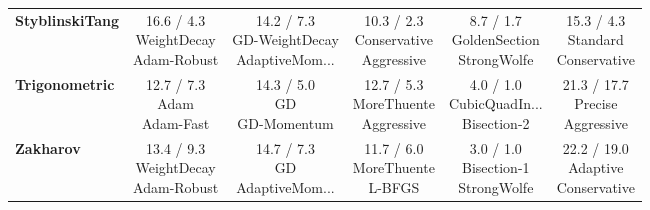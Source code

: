 \documentclass{article}
\begin{document}
\begin{longtable}{lccccc}
\textbf{StyblinskiTang} & \cellcolor{worstred!20} \makecell{16.6 / 4.3 \\ \scriptsize{WeightDecay} \\ \scriptsize{Adam-Robust}}&  \makecell{14.2 / 7.3 \\ \scriptsize{GD-WeightDecay} \\ \scriptsize{AdaptiveMom...}}&  \makecell{10.3 / 2.3 \\ \scriptsize{Conservative} \\ \scriptsize{Aggressive}}& \cellcolor{bestgreen!30} \makecell{8.7 / 1.7 \\ \scriptsize{GoldenSection} \\ \scriptsize{StrongWolfe}}&  \makecell{15.3 / 4.3 \\ \scriptsize{Standard} \\ \scriptsize{Conservative}} \\
\textbf{Trigonometric} &  \makecell{12.7 / 7.3 \\ \scriptsize{Adam} \\ \scriptsize{Adam-Fast}}&  \makecell{14.3 / 5.0 \\ \scriptsize{GD} \\ \scriptsize{GD-Momentum}}&  \makecell{12.7 / 5.3 \\ \scriptsize{MoreThuente} \\ \scriptsize{Aggressive}}& \cellcolor{bestgreen!30} \makecell{4.0 / 1.0 \\ \scriptsize{CubicQuadIn...} \\ \scriptsize{Bisection-2}}& \cellcolor{worstred!20} \makecell{21.3 / 17.7 \\ \scriptsize{Precise} \\ \scriptsize{Aggressive}} \\
\textbf{Zakharov} &  \makecell{13.4 / 9.3 \\ \scriptsize{WeightDecay} \\ \scriptsize{Adam-Robust}}&  \makecell{14.7 / 7.3 \\ \scriptsize{GD} \\ \scriptsize{AdaptiveMom...}}&  \makecell{11.7 / 6.0 \\ \scriptsize{MoreThuente} \\ \scriptsize{L-BFGS}}& \cellcolor{bestgreen!30} \makecell{3.0 / 1.0 \\ \scriptsize{Bisection-1} \\ \scriptsize{StrongWolfe}}& \cellcolor{worstred!20} \makecell{22.2 / 19.0 \\ \scriptsize{Adaptive} \\ \scriptsize{Conservative}} \\
\end{longtable}
\end{document}
